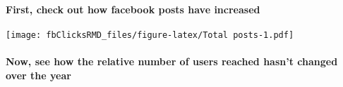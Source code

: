 \documentclass[
]{article}
\newenvironment{Shaded}{\begin{snugshade}}{\end{snugshade}}
\newcommand{\DataTypeTok}[1]{\textcolor[rgb]{0.13,0.29,0.53}{#1}}
\newcommand{\DecValTok}[1]{\textcolor[rgb]{0.00,0.00,0.81}{#1}}
\newcommand{\KeywordTok}[1]{\textcolor[rgb]{0.13,0.29,0.53}{\textbf{#1}}}
\newcommand{\NormalTok}[1]{#1}
\newcommand{\OperatorTok}[1]{\textcolor[rgb]{0.81,0.36,0.00}{\textbf{#1}}}
\newcommand{\StringTok}[1]{\textcolor[rgb]{0.31,0.60,0.02}{#1}}
\let\oldparagraph\paragraph
\renewcommand{\paragraph}[1]{\oldparagraph{#1}\mbox{}}
\begin{document}
\hypertarget{first-check-out-how-facebook-posts-have-increased}{%
\paragraph{First, check out how facebook posts have
increased}\label{first-check-out-how-facebook-posts-have-increased}}

\vspace{24pt}

\begin{Shaded}
\end{Shaded}

\texttt{[image: fbClicksRMD\_files/figure-latex/Total posts-1.pdf]}

\hypertarget{now-see-how-the-relative-number-of-users-reached-hasnt-changed-over-the-year}{%
\paragraph{Now, see how the relative number of users reached hasn't
changed over the
year}\label{now-see-how-the-relative-number-of-users-reached-hasnt-changed-over-the-year}}

\vspace{24pt}
\end{document}
